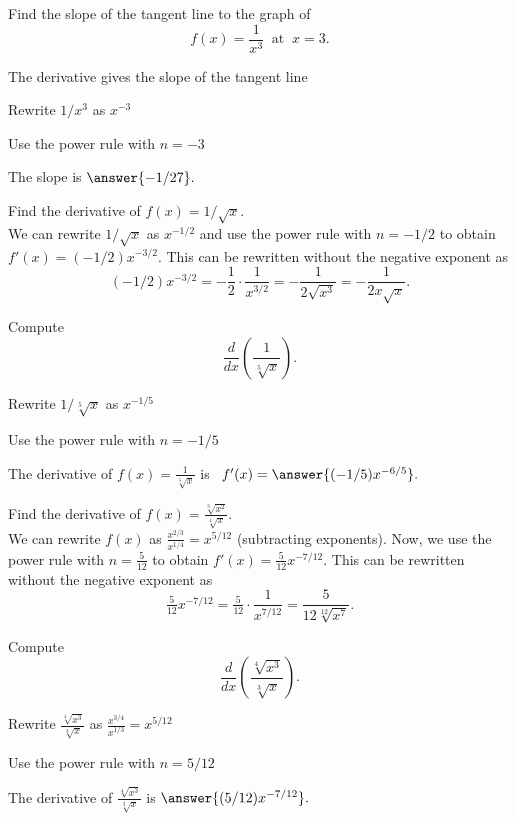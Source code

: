 \documentclass{ximera}
\begin{document}
\begin{problem}
Find the slope of the tangent line to the graph of 
\[
f(x) = \frac{1}{x^3} \;\; \text{at} \;\; x = 3.
\]


\begin{hint}
The derivative gives the slope of the tangent line
\end{hint}
\begin{hint}
Rewrite $1/x^3$ as $x^{-3}$
\end{hint}
\begin{hint}
Use the power rule with $n = -3$
\end{hint}
The slope is  $\answer{-1/27}.$
\end{problem}


\begin{example} %
Find the derivative of $f(x) = 1/\sqrt x$.\\
We can rewrite $1/\sqrt x$ as $x^{-1/2}$ and use the power rule with $n = -1/2$ to obtain
$f'(x) = (-1/2)x^{-3/2}$. This can be rewritten without the negative exponent as
\[(-1/2)x^{-3/2}= -\frac{1}{2} \cdot \frac{1}{x^{3/2}} = -\frac{1}{2\sqrt{x^3}} = -\frac{1}{2x\sqrt x}.\]
\end{example}


\begin{problem}
Compute
\[
\frac{d}{dx} \left(\frac{1}{\sqrt[5] x}\right).
\]
\begin{hint}
Rewrite $1/\sqrt[5] x$ as $x^{-1/5}$
\end{hint}
\begin{hint}
Use the power rule with $n = -1/5$
\end{hint}
The derivative of $f(x) = \frac{1}{\sqrt[5] x}$ is \ $f'(x) = \answer{(-1/5) x^{-6/5}}.$
\end{problem}


\begin{example} %
Find the derivative of $f(x) = \frac{\sqrt[3] {x^2}}{\sqrt[4] x}.$\\
We can rewrite $f(x)$ as $\frac{x^{2/3}}{x^{1/4}} = x^{5/12}$ 
(subtracting exponents). Now, we use the power rule with $n = \frac{5}{12}$ to obtain $f'(x) = \tfrac{5}{12}x^{-7/12}.$
This can be rewritten without the negative exponent as
\[\tfrac{5}{12}x^{-7/12} = \tfrac{5}{12} \cdot \frac{1}{x^{7/12}} = \frac{5}{12\sqrt[12]{x^7}}.\]
\end{example}

\begin{problem}
Compute
\[
\frac{d}{dx} \left(\frac{\sqrt[4] {x^3}}{\sqrt[3] x}\right).
\]
\begin{hint}
Rewrite $\frac{\sqrt[4] {x^3}}{\sqrt[3] x}$ as $\frac{x^{3/4}}{x^{1/3}} = x^{5/12}$
\end{hint}
\begin{hint}
Use the power rule with $n = 5/12$
\end{hint}
The derivative of $\frac{\sqrt[4] {x^3}}{\sqrt[3] x}$ is $\answer{(5/12) x^{-7/12}}.$
\end{problem}
\end{document}
